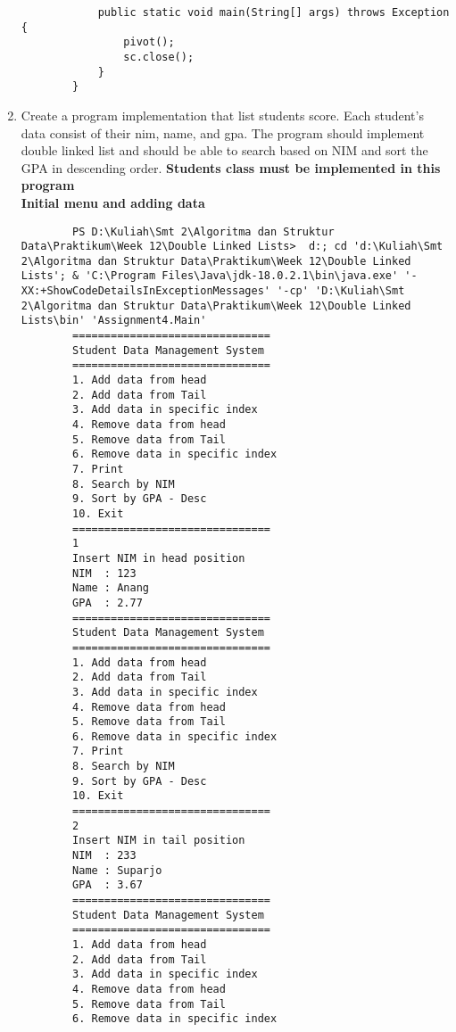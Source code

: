 \documentclass[12pt,titlepage]{article}
\begin{document}
\begin{enumerate}
\begin{verbatim}
            public static void main(String[] args) throws Exception {
                pivot();
                sc.close();
            }
        }
    \end{verbatim}
    \item Create a program implementation that list students score. Each student’s data consist of their nim, name, and gpa. The program should implement double linked list and should be able to search based on NIM and sort the GPA in descending order. \textbf{Students class must be implemented in this program}
    \hbox{}\\\textbf{Initial menu and adding data}
    \begin{verbatim}
        PS D:\Kuliah\Smt 2\Algoritma dan Struktur Data\Praktikum\Week 12\Double Linked Lists>  d:; cd 'd:\Kuliah\Smt 2\Algoritma dan Struktur Data\Praktikum\Week 12\Double Linked Lists'; & 'C:\Program Files\Java\jdk-18.0.2.1\bin\java.exe' '-XX:+ShowCodeDetailsInExceptionMessages' '-cp' 'D:\Kuliah\Smt 2\Algoritma dan Struktur Data\Praktikum\Week 12\Double Linked Lists\bin' 'Assignment4.Main' 
        =============================== 
        Student Data Management System  
        =============================== 
        1. Add data from head
        2. Add data from Tail
        3. Add data in specific index   
        4. Remove data from head        
        5. Remove data from Tail        
        6. Remove data in specific index
        7. Print
        8. Search by NIM
        9. Sort by GPA - Desc
        10. Exit
        =============================== 
        1
        Insert NIM in head position
        NIM  : 123
        Name : Anang
        GPA  : 2.77
        =============================== 
        Student Data Management System  
        =============================== 
        1. Add data from head
        2. Add data from Tail
        3. Add data in specific index   
        4. Remove data from head
        5. Remove data from Tail
        6. Remove data in specific index
        7. Print
        8. Search by NIM
        9. Sort by GPA - Desc
        10. Exit
        ===============================
        2
        Insert NIM in tail position
        NIM  : 233
        Name : Suparjo
        GPA  : 3.67
        =============================== 
        Student Data Management System
        ===============================
        1. Add data from head
        2. Add data from Tail
        3. Add data in specific index
        4. Remove data from head
        5. Remove data from Tail
        6. Remove data in specific index

\end{verbatim}
\end{enumerate}
\end{document}

